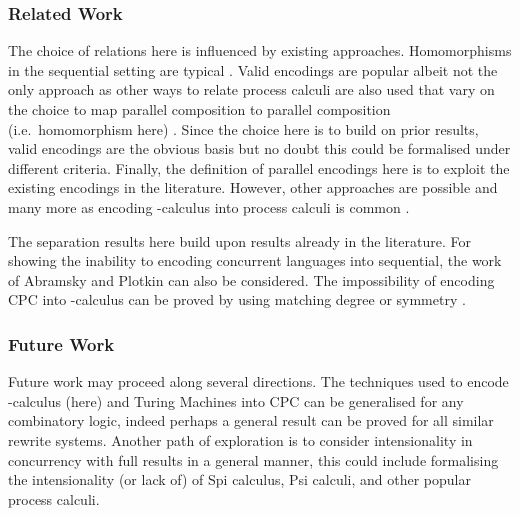 \documentclass{llncs}
\newcommand{\withrw}[1]{#1}
\begin{document}
\withrw{
\vspace*{-0.3cm}
\subsubsection*{Related Work}

The choice of relations here is influenced by existing approaches.
Homomorphisms in the sequential setting are typical \cite{Curry58combinatorylogic,Barendregt85,Felleisen199135}.
Valid encodings are popular \cite{G:IC08,G:DC10,G:CONCUR08,LPSS10,LVF10,gla12}
albeit not the only approach as other ways to relate process calculi are also used
that vary on the choice to map parallel composition to parallel composition (i.e.~homomorphism here)
\cite{journals/corr/cs-PL-9809008,journals/iandc/BusiGZ00,DeNicola:2006:EPK:1148743.1148750,DBLP:journals/corr/abs-1011-6436,gla12}.
Since the choice here is to build on prior results, valid encodings are the obvious
basis 
but no doubt this could be formalised
under different criteria.
Finally, the definition of parallel encodings here is to exploit the existing
encodings in the literature. 
However, other approaches are possible
\cite{90426,parrow.victor:fusion-calculus} and
many more as encoding -calculus into process calculi is common
\cite{96717,milner.parrow.ea:calculus-mobile,1998:MobileAmbients,citeulike:500640}.

The separation results here build upon results already in the literature.
For showing the inability to encoding concurrent languages into sequential, the
work of Abramsky \cite{Abramsky90thelazy} and Plotkin \cite{Plotkin97fullabstraction} can also be considered.
The impossibility of encoding CPC into -calculus can be proved by using
matching degree or symmetry \cite[proofs for Theorem~7.2.5]{GivenWilsonPHD}.

}


\vspace*{-0.3cm}
\subsubsection*{Future Work}
Future work may proceed along several directions.
The techniques used to encode -calculus (here) and Turing Machines \cite{givenwilson:hal-00987594}
into CPC can be generalised for any combinatory logic,
indeed perhaps a general result can be proved for all similar rewrite systems.
Another path of exploration is to consider intensionality in concurrency with full results in a general manner,
this could include formalising the intensionality (or lack of) of Spi calculus, Psi calculi, and other popular process calculi.

\vspace*{-0.3cm}


\end{document}
